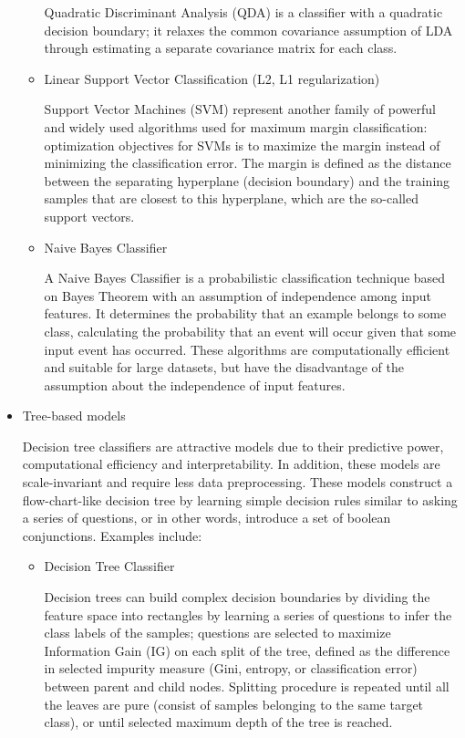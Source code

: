 \begin{itemize}
\begin{itemize}
        Quadratic Discriminant Analysis (QDA) is a classifier with a quadratic decision boundary;
        it relaxes the common covariance assumption of LDA through estimating a separate covariance matrix for each class.

        \item Linear Support Vector Classification (L2, L1 regularization)

        Support Vector Machines (SVM) represent another family of powerful and widely used algorithms used for maximum margin classification: optimization objectives for SVMs is to maximize the margin instead of minimizing the classification error.
        The margin is defined as the distance between the separating hyperplane (decision boundary) and the training samples that are closest to this hyperplane, which are the so-called support vectors\cite{RaschkaMirjalili2017}.

        \item Naive Bayes Classifier

        A Naive Bayes Classifier is a probabilistic classification technique based on Bayes Theorem with an assumption of independence among input features.
        It determines the probability that an example belongs to some class, calculating the probability that an event will occur given that some input event has occurred.
        These algorithms are computationally efficient and suitable for large datasets, but have the disadvantage of the assumption about the independence of input features.

    \end{itemize}

    \item Tree-based models

    Decision tree classifiers are attractive models due to their predictive power, computational efficiency and interpretability.
    In addition, these models are scale-invariant and require less data preprocessing.
    These models construct a flow-chart-like decision tree by learning simple decision rules similar to asking a series of questions, or in other words, introduce a set of boolean conjunctions.
    Examples include:

    \begin{itemize}

        \item Decision Tree Classifier

        Decision trees can build complex decision boundaries by dividing the feature space into rectangles by learning a series of questions to infer the class labels of the samples;
        questions are selected to maximize Information Gain (IG) on each split of the tree, defined as the difference in selected impurity measure (Gini, entropy, or classification error) between parent and child nodes.
        Splitting procedure is repeated until all the leaves are pure (consist of samples belonging to the same target class), or until selected maximum depth of the tree is reached.


\end{itemize}
\end{itemize}

